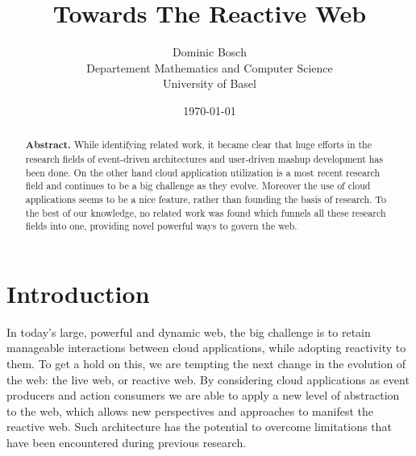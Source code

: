 \documentclass[11pt]{article}%
\newcommand{\subtitle}[1]{%
  \posttitle{%
    \par\end{center}
    \begin{center}\large#1\end{center}
    \vskip0.5em}%
}
\begin{document}
\title{\huge Towards The Reactive Web\vspace*{15 mm}}
\date{\today}
\author{\fontsize{11}{9}\selectfont Dominic Bosch \\ Departement Mathematics and Computer Science \\ University of Basel}
\maketitle

\renewcommand{\abstractname}{}
\begin{abstract}
\textbf{Abstract.}
While identifying related work, it became clear that huge efforts in the research fields of event-driven architectures and user-driven mashup development has been done. On the other hand cloud application utilization is a most recent research field and continues to be a big challenge as they evolve. Moreover the use of cloud applications seems to be a nice feature, rather than founding the basis of research. To the best of our knowledge, no related work was found which funnels all these research fields into one, providing novel powerful ways to govern the web.
\end{abstract}

\section{Introduction}
In today's large, powerful and dynamic web, the big challenge is to retain manageable interactions between cloud applications, while adopting reactivity to them. To get a hold on this, we are tempting the next change in the evolution of the web: the live web, or reactive web. By considering cloud applications as event producers and action consumers we are able to apply a new level of abstraction to the web, which allows new perspectives and approaches to manifest the reactive web. Such architecture has the potential to overcome limitations that have been encountered during previous research.
\end{document}
